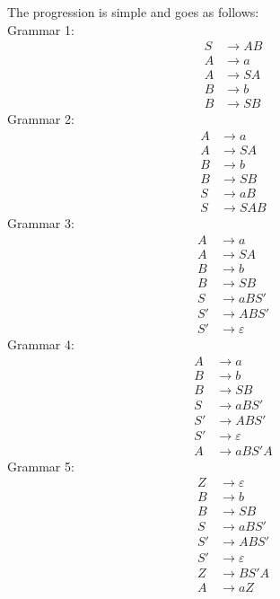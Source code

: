 \documentclass[11pt]{article}
\begin{document}
The progression is simple and goes as follows:\\
Grammar 1:
\setcounter{equation}{0}
\begin{align}
S &\rightarrow A B\\
A &\rightarrow a\\
A &\rightarrow S A\\
B &\rightarrow b\\
B &\rightarrow S B
\end{align}
Grammar 2:
\setcounter{equation}{0}
\begin{align}
A &\rightarrow a\\
A &\rightarrow S A\\
B &\rightarrow b\\
B &\rightarrow S B\\
S &\rightarrow a B\\
S &\rightarrow S A B
\end{align}
Grammar 3:
\setcounter{equation}{0}
\begin{align}
A &\rightarrow a\\
A &\rightarrow S A\\
B &\rightarrow b\\
B &\rightarrow S B\\
S &\rightarrow a B S'\\
S' &\rightarrow A B S'\\
S' &\rightarrow ε
\end{align}
Grammar 4:
\setcounter{equation}{0}
\begin{align}
A &\rightarrow a\\
B &\rightarrow b\\
B &\rightarrow S B\\
S &\rightarrow a B S'\\
S' &\rightarrow A B S'\\
S' &\rightarrow ε\\
A &\rightarrow a B S' A
\end{align}
Grammar 5:
\setcounter{equation}{0}
\begin{align}
Z &\rightarrow ε\\
B &\rightarrow b\\
B &\rightarrow S B\\
S &\rightarrow a B S'\\
S' &\rightarrow A B S'\\
S' &\rightarrow ε\\
Z &\rightarrow B S' A\\
A &\rightarrow a Z
\end{align}
\end{document}

